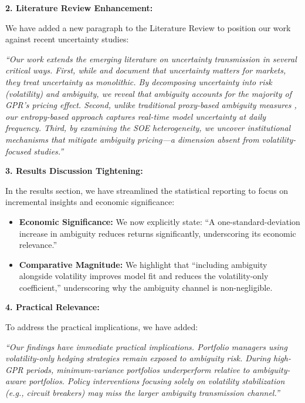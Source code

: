 \documentclass[12pt]{article}
\begin{document}
\begin{enumerate}
\begin{responsebox}
    \vspace{0.5cm}
    
    \textbf{2. Literature Review Enhancement:}
    
    We have added a new paragraph to the Literature Review to position our work against recent uncertainty studies:

    \textit{``Our work extends the emerging literature on uncertainty transmission in several critical ways. First, while \citet{Baker2016} and \citet{Caldara2022} document that uncertainty matters for markets, they treat uncertainty as monolithic. By decomposing uncertainty into risk (volatility) and ambiguity, we reveal that ambiguity accounts for the majority of GPR's pricing effect. Second, unlike traditional proxy-based ambiguity measures \citep{Brenner2018}, our entropy-based approach captures real-time model uncertainty at daily frequency. Third, by examining the SOE heterogeneity, we uncover institutional mechanisms that mitigate ambiguity pricing---a dimension absent from volatility-focused studies.''}

    \vspace{0.5cm}
    
    \textbf{3. Results Discussion Tightening:}
    
    In the results section, we have streamlined the statistical reporting to focus on incremental insights and economic significance:

    \begin{itemize}
        \item \textbf{Economic Significance:} We now explicitly state: ``A one-standard-deviation increase in ambiguity reduces returns significantly, underscoring its economic relevance.''
        \item \textbf{Comparative Magnitude:} We highlight that ``including ambiguity alongside volatility improves model fit and reduces the volatility-only coefficient,'' underscoring why the ambiguity channel is non-negligible.
    \end{itemize}

    \textbf{4. Practical Relevance:}
    
    To address the practical implications, we have added:

    \textit{``Our findings have immediate practical implications. Portfolio managers using volatility-only hedging strategies remain exposed to ambiguity risk. During high-GPR periods, minimum-variance portfolios underperform relative to ambiguity-aware portfolios. Policy interventions focusing solely on volatility stabilization (e.g., circuit breakers) may miss the larger ambiguity transmission channel.''}
    \end{responsebox}

\end{enumerate}
\end{document}
